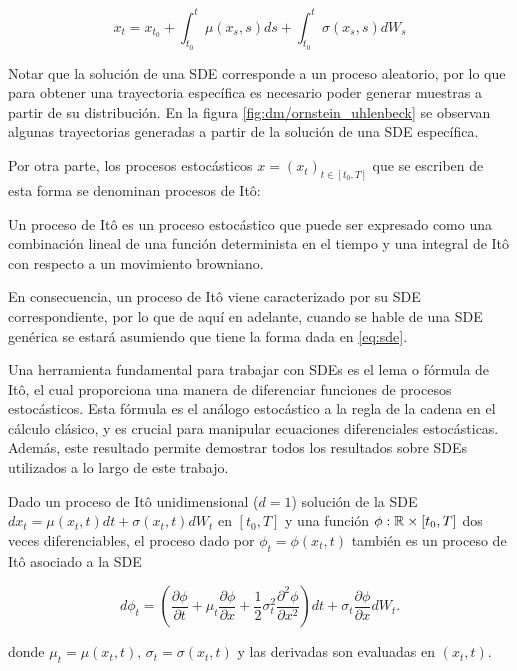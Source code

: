 \begin{equation}
    x_t = x_{t_0} + \int_{t_0}^t \mu(x_s,s)ds + \int_{t_0}^t \sigma(x_s,s) dW_s
\end{equation}

Notar que la solución de una SDE corresponde a un proceso aleatorio, por lo que para obtener una trayectoria específica es necesario poder generar muestras a partir de su distribución. En la figura \ref{fig:dm/ornstein_uhlenbeck} se observan algunas trayectorias generadas a partir de la solución de una SDE específica.

Por otra parte, los procesos estocásticos $x=(x_t)_{t\in[t_0,T]}$ que se escriben de esta forma se denominan procesos de Itô:

\begin{defn}
    Un proceso de Itô es un proceso estocástico que puede ser expresado como una combinación lineal de una función determinista en el tiempo y una integral de Itô con respecto a un movimiento browniano.
\end{defn}

En consecuencia, un proceso de Itô viene caracterizado por su SDE correspondiente, por lo que de aquí en adelante, cuando se hable de una SDE genérica se estará asumiendo que tiene la forma dada en \eqref{eq:sde}.

Una herramienta fundamental para trabajar con SDEs es el lema o fórmula de Itô, el cual proporciona una manera de diferenciar funciones de procesos estocásticos. Esta fórmula es el análogo estocástico a la regla de la cadena en el cálculo clásico, y es crucial para manipular ecuaciones diferenciales estocásticas. Además, este resultado permite demostrar todos los resultados sobre SDEs utilizados a lo largo de este trabajo.

\begin{teo}
    \label{teo:itos_formula}
    Dado un proceso de Itô unidimensional ($d=1$) solución de la SDE $dx_t = \mu(x_t,t)dt + \sigma(x_t,t)dW_t$ en $[t_0,T]$ y una función $\phi:\mathbb{R}\times [t_0,T]$ dos veces diferenciables, el proceso dado por $\phi_t = \phi(x_t,t)$ también es un proceso de Itô asociado a la SDE

    \begin{equation}
        \label{eq:itos_formula}
        d\phi_t = \left( \frac{\partial\phi}{\partial t} + \mu_t \frac{\partial\phi}{\partial x} + \frac{1}{2} \sigma^2_t \frac{\partial^2\phi}{\partial x^2} \right) dt + \sigma_t \frac{\partial\phi}{\partial x} dW_t.
    \end{equation}

    donde $\mu_t = \mu(x_t,t),\,\sigma_t = \sigma(x_t,t)$ y las derivadas son evaluadas en $(x_t,t)$.

\end{teo}

